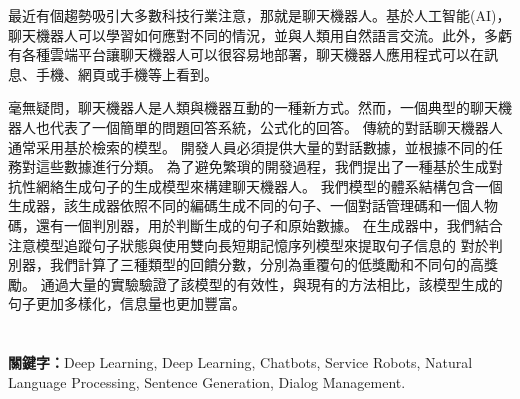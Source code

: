 最近有個趨勢吸引大多數科技行業注意，那就是聊天機器人。基於人工智能(AI)，聊天機器人可以學習如何應對不同的情況，並與人類用自然語言交流。此外，多虧有各種雲端平台讓聊天機器人可以很容易地部署，聊天機器人應用程式可以在訊息、手機、網頁或手機等上看到。

毫無疑問，聊天機器人是人類與機器互動的一種新方式。然而，一個典型的聊天機器人也代表了一個簡單的問題回答系統，公式化的回答。
傳統的對話聊天機器人通常采用基於檢索的模型。
開發人員必須提供大量的對話數據，並根據不同的任務對這些數據進行分類。
為了避免繁瑣的開發過程，我們提出了一種基於生成對抗性網絡生成句子的生成模型來構建聊天機器人。
我們模型的體系結構包含一個生成器，該生成器依照不同的編碼生成不同的句子、一個對話管理碼和一個人物碼，還有一個判別器，用於判斷生成的句子和原始數據。
在生成器中，我們結合注意模型追蹤句子狀態與使用雙向長短期記憶序列模型來提取句子信息的
對於判別器，我們計算了三種類型的回饋分數，分別為重覆句的低獎勵和不同句的高獎勵。
通過大量的實驗驗證了該模型的有效性，與現有的方法相比，該模型生成的句子更加多樣化，信息量也更加豐富。
\\
\\
\\
\textbf{關鍵字：}Deep Learning, Deep Learning, Chatbots, Service Robots, Natural Language Processing, Sentence Generation, Dialog Management.
\\